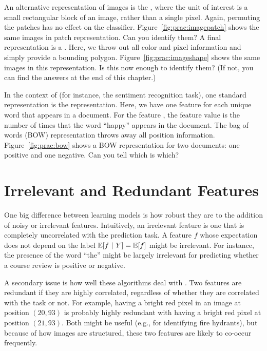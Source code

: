 An alternative representation of images is the , where the unit of interest is a small rectangular
block of an image, rather than a single pixel.  Again, permuting the
patches has no effect on the classifier.
Figure~\ref{fig:prac:imagepatch} shows the same images in patch
representation.  Can you identify them?  A final representation is a
.  Here, we throw out all color and
pixel information and simply provide a bounding polygon.
Figure~\ref{fig:prac:imageshape} shows the same images in this
representation.  Is this now enough to identify them?  (If not, you
can find the answers at the end of this chapter.)


In the context of  (for instance, the
sentiment recognition task), one standard representation is the
 representation.  Here, we have one feature for
each unique word that appears in a document.  For the feature
, the feature value is the number of times that the word
``happy'' appears in the document.  The bag of words (BOW)
representation throws away all position information.
Figure~\ref{fig:prac:bow} shows a BOW representation for two
documents: one positive and one negative.  Can you tell which is
which?

\section{Irrelevant and Redundant Features}

One big difference between learning models is how robust they are to
the addition of noisy or irrelevant features.  Intuitively, an
irrelevant feature is one that is completely uncorrelated with the
prediction task.  A feature $f$ whose expectation does not depend on
the label $\mathbb{E}[f \textrm{~}\arrowvert\textrm{~} Y] = \mathbb{E}[f]$ might be irrelevant.  For instance,
the presence of the word ``the'' might be largely irrelevant for
predicting whether a course review is positive or negative.  


A secondary issue is how well these algorithms deal with
.  Two features are redundant if they are
highly correlated, regardless of whether they are correlated with the
task or not.  For example, having a bright red pixel in an image at
position $(20,93)$ is probably highly redundant with having a bright
red pixel at position $(21,93)$.  Both might be useful (e.g., for
identifying fire hydrants), but because of how images are structured,
these two features are likely to co-occur frequently.

